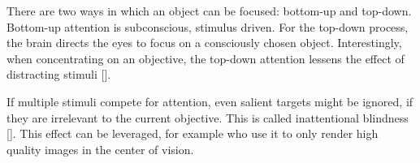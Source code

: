 
There are two ways in which an object can be focused: bottom-up and top-down. Bottom-up attention is subconscious, stimulus driven. For the top-down process, the brain directs the eyes to focus on a consciously chosen object. Interestingly, when concentrating on an objective, the top-down attention lessens the effect of distracting stimuli [\cite{connorVisualAttentionBottomUp2004}].

If multiple stimuli compete for attention, even salient targets might be ignored, if they are irrelevant to the current objective. This is called inattentional blindness [\cite{jensenChangeBlindnessInattentional2011}]. This effect can be leveraged, for example \textcite{caterSelectiveQualityRendering2002} who use it to only render high quality images in the center of vision.
